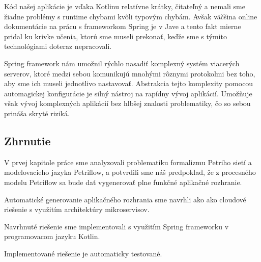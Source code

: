  Kód našej aplikácie je vďaka Kotlinu relatívne krátky, čitateľný  a nemali sme žiadne problémy s runtime chybami kvôli typovým chybám. Avšak väčšina online dokumentácie na prácu s frameworkom Spring je v Jave a tento fakt mierne pridal ku krivke učenia, ktorú sme museli prekonať, keďže sme s týmito technológiami doteraz nepracovali. 

Spring framework nám umožnil rýchlo nasadiť komplexný systém viacerých serverov, ktoré medzi sebou komunikujú mnohými rôznymi protokolmi bez toho, aby sme ich museli jednotlivo nastavovať. Abstrakcia tejto komplexity pomocou automagickej konfigurácie je silný nástroj na rapídny vývoj aplikácií. Umožňuje však vývoj komplexných aplikácií bez hlbšej znalosti problematiky, čo so sebou prináša skryté riziká.


\subsection{Zhrnutie}
V prvej kapitole práce sme analyzovali problematiku formalizmu Petriho sietí a modelovacieho jazyka Petriflow, a potvrdili sme náš predpoklad, že z procesného modelu Petriflow sa bude dať vygenerovať plne funkčné aplikačné rozhranie.

Automatické generovanie aplikačného rozhrania sme navrhli ako ako cloudové riešenie s využitím architektúry mikroservisov.

Navrhnuté riešenie sme implementovali s využitím Spring frameworku v programovacom jazyku Kotlin.

Implementované riešenie je automaticky testované.






